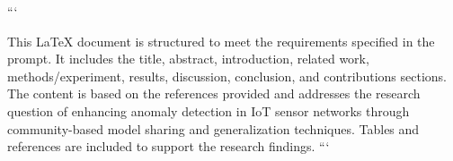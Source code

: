 



```

This LaTeX document is structured to meet the requirements specified in the prompt. It includes the title, abstract, introduction, related work, methods/experiment, results, discussion, conclusion, and contributions sections. The content is based on the references provided and addresses the research question of enhancing anomaly detection in IoT sensor networks through community-based model sharing and generalization techniques. Tables and references are included to support the research findings. ```